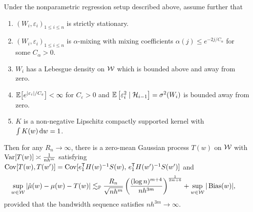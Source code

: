 \begin{proposition}%
  \label{pro:yurinskii_local_poly}

  Under the nonparametric regression setup described above,
  assume further that
  \begin{enumerate}[label=(\roman*)]

    \item
      $(W_i, \varepsilon_i)_{1 \leq i \leq n}$
      is strictly stationary.

    \item
      $(W_i, \varepsilon_i)_{1 \leq i \leq n}$
      is $\alpha$-mixing with mixing coefficients
      $\alpha(j) \leq e^{-2 j / C_\alpha}$
      for some $C_\alpha > 0$.

    \item
      $W_i$ has a Lebesgue density on $\mathcal{W}$
      which is bounded above and away from zero.

    \item
      $\mathbb{E}\big[e^{|\varepsilon_i|/C_\varepsilon}\big] < \infty$
      for $C_\varepsilon > 0$ and
      $\mathbb{E}\left[\varepsilon^2_i \mid \mathcal{H}_{i-1}\right]=\sigma^2(W_i)$
      is bounded away from zero.

    \item
      $K$ is a non-negative Lipschitz
      compactly supported kernel with
      $\int K(w) \,\mathrm{d}w = 1$.

  \end{enumerate}
  Then for any $R_n \to \infty$,
  there is a zero-mean Gaussian process
  $T(w)$ on $\mathcal{W}$
  with $\operatorname{Var}[T(w)] \asymp\frac{1}{n h^m}$
  satisfying
  $\operatorname{Cov}[T(w), T(w')]
  = \operatorname{Cov}[e_1^{\mathsf{T}} H(w)^{-1} S(w),\, e_1^{\mathsf{T}} H(w')^{-1} S(w')]$
  and
  \begin{align*}
    \sup_{w \in \mathcal{W}}
    \left|\hat \mu(w) - \mu(w) - T(w) \right|
    &\lesssim_{\mathbb{P}}
    \frac{R_n}{\sqrt{n h^m}}
    \left(
      \frac{(\log n)^{m+4}}{n h^{3m}}
    \right)^{\frac{1}{2m+6}}
    + \sup_{w \in \mathcal{W}} |\operatorname{Bias}(w)|,
  \end{align*}
  provided that the bandwidth sequence satisfies
  $n h^{3m} \to \infty$.
\end{proposition}

